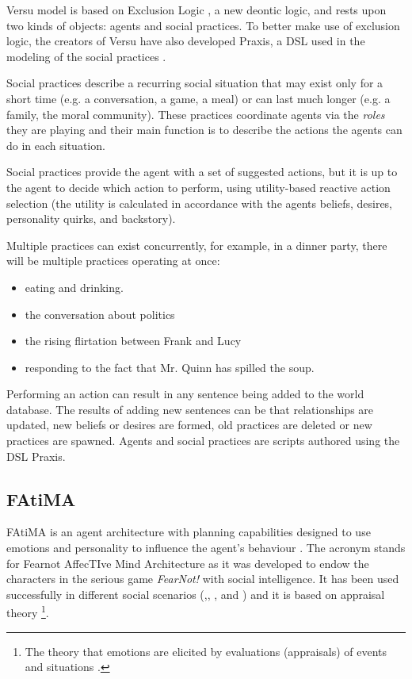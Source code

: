 \noindent Versu model is based on Exclusion Logic \cite{evans:exclusion-logic}, a new deontic logic, and rests upon two kinds of objects: agents and social practices.
To better make use of exclusion logic, the creators of Versu have also developed Praxis, a \ac{DSL} used in the modeling of the social practices .

Social practices describe a recurring social situation that may exist only for a short time (e.g. a conversation, a game, a meal) or can last much longer (e.g. a family, the moral community).
These practices coordinate agents via the \textit{roles} they are playing and their main function is to describe the actions the agents can do in each situation.

Social practices provide the agent with a set of suggested actions, but it is up to the agent to decide which action to perform, using utility-based reactive action selection (the utility is calculated in accordance with the agents beliefs, desires, personality quirks, and backstory).

Multiple practices can exist concurrently, for example, in a dinner party, there will be multiple practices operating at once:

\begin{itemize}
\item eating and drinking.
\item the conversation about politics
\item the rising flirtation between Frank and Lucy
\item responding to the fact that Mr. Quinn has spilled the soup.
\end{itemize}

Performing an action can result in any sentence being added to the world database.
The results of adding new sentences can be that relationships are updated, new beliefs or desires are formed, old practices are deleted or new practices are spawned.
Agents and social practices are scripts authored using the \ac{DSL} Praxis.

\subsection{FAtiMA}
\label{subsection:fatima}

\noindent \ac{FAtiMA} is an agent architecture with planning capabilities designed to use emotions and personality to influence the agent's behaviour \cite{dias:fatima-modular}.
The acronym stands for Fearnot AffecTIve Mind Architecture as it was developed to endow the characters in the serious game \textit{FearNot!} \cite{aylett:fearnot} with social intelligence.
It has been used successfully in different social scenarios (\cite{paiva:learning-by-feeling},\cite{rodrigues:i-can-feel-to}, \cite{aylett:intercultural-empathy}, and \cite{correia:sueca}) and it is based on appraisal theory \footnote{The theory that emotions are elicited by evaluations (appraisals) of events and situations \cite{roseman:appraisal}.}.

